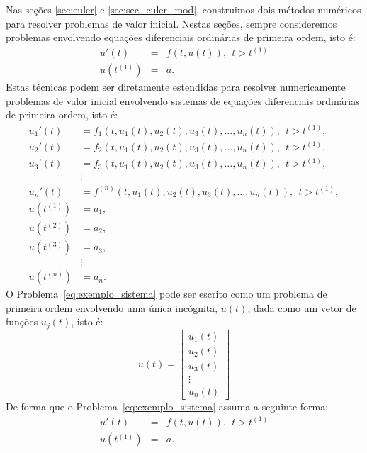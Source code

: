 Nas seções \ref{sec:euler} e \ref{sec:sec_euler_mod}, construimos dois métodos numéricos para resolver problemas de valor inicial. Nestas seções, sempre consideremos problemas envolvendo equações diferenciais ordinárias de primeira ordem, isto é:
\begin{eqnarray}
  u'(t)  &=& f(t,u(t)),~~t>t^{(1)} \\
  u(t^{(1)}) &=& a.
\end{eqnarray}
Estas técnicas podem ser diretamente estendidas para resolver numericamente problemas de valor inicial envolvendo sistemas de equações diferenciais ordinárias de primeira ordem, isto é:
\begin{equation}\label{eq:exemplo_sistema}
  \begin{split}
    u_1'(t)  &= f_1(t,u_1(t), u_2(t), u_3(t),\ldots, u_n(t)),~~t>t^{(1)} ,\\
    u_2'(t)  &= f_2(t,u_1(t), u_2(t), u_3(t),\ldots, u_n(t)),~~t>t^{(1)} ,\\
    u_3'(t)  &= f_3(t,u_1(t), u_2(t), u_3(t),\ldots, u_n(t)),~~t>t^{(1)} ,\\
    &\vdots \\
    u_n'(t)  &= f^{(n)}(t,u_1(t), u_2(t), u_3(t),\ldots, u_n(t)),~~t>t^{(1)} ,\\
    u(t^{(1)}) &= a_1 ,\\
    u(t^{(2)}) &= a_2 ,\\
    u(t^{(3)}) &= a_3 ,\\
    &\vdots\\
    u(t^{(n)}) &= a_n.
  \end{split}
\end{equation}
O Problema~\eqref{eq:exemplo_sistema} pode ser escrito como um problema de primeira ordem envolvendo uma única incógnita, $u(t)$, dada como um vetor de funções $u_j(t)$, isto é:
\begin{equation}u(t)=\left[
\begin{array}{c}
 u_1(t)\\
 u_2(t)\\
 u_3(t)\\
 \vdots\\
 u_n(t)
\end{array}
\right]\end{equation}
De forma que o Problema~\eqref{eq:exemplo_sistema} assuma a seguinte forma:
\begin{eqnarray}
  u'(t)  &=& f(t,u(t)),~~t>t^{(1)} \\
  u(t^{(1)}) &=& a.
\end{eqnarray}
